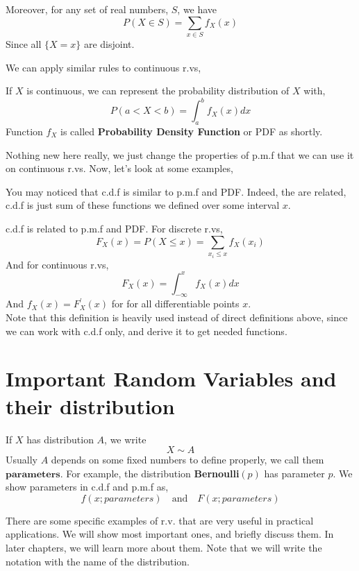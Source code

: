Moreover, for any set of real numbers, $S$, we have
\[ P (X \in S) = \sum_{x \in S} f_X(x)\]
Since all $\{X = x \}$  are disjoint.\\
\par
We can apply similar rules to continuous r.vs,
\begin{definition}
    If $X$ is continuous, we can represent the probability distribution of $X$ with,
    \[ P(a < X < b) = \int_{a}^{b} f_X(x) dx \]
    Function  $f_X$ is called \textbf{Probability Density Function} or PDF as shortly.
\end{definition}
Nothing new here really, we just change the properties of p.m.f that we can use it on continuous r.vs. Now, let's look at some examples,\\
\par
You may noticed that c.d.f is similar to p.m.f and PDF. Indeed, the are related, c.d.f is just sum of these functions we defined over some
interval $x$.
\begin{definition}
    c.d.f is related to p.m.f and PDF. For discrete r.vs,
    \[F_X(x) = P(X \le x) = \sum_{x_i \le x} f_X(x_i)\]
    And for continuous r.vs,
    \[F_X(x)= \int_{-\infty}^x f_X(x)dx \]
    And $f_X(x) = F_X^{'}(x)$ for for all differentiable points $x$.\\

    Note that this definition is heavily used instead of direct definitions above, since we can work with c.d.f only, and derive it to get
    needed functions.
\end{definition}
\par


\section{Important Random Variables and their distribution}
\begin{definition}
    If $X$ has distribution $A$, we write
    \[ X \sim A\]
    Usually $A$ depends on some fixed numbers to define properly, we call them $\textbf{parameters}$. For example, the distribution
    \textbf{Bernoulli}$(p)$ has parameter $p$. We show parameters in c.d.f and p.m.f as,
    \[ f(x; parameters) \quad \text{and} \quad F(x; parameters) \]

\end{definition}
There are some specific examples of r.v. that are very useful in practical applications. We will show most important ones, and briefly
discuss them. In later chapters, we will learn more about them. Note that we will write the notation with the name of the distribution.

